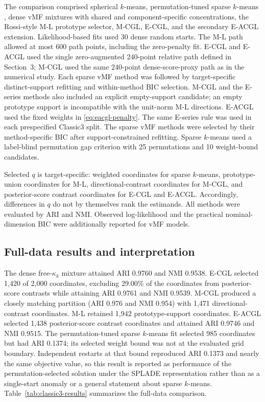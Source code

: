 \documentclass[preprint,12pt,authoryear]{elsarticle}
\begin{document}
The comparison comprised spherical $k$-means, permutation-tuned sparse
$k$-means \citep{witten2010sparseclustering}, dense vMF mixtures with shared
and component-specific concentrations, the Rossi-style M-L prototype selector,
M-CGL, E-CGL, and the secondary E-ACGL extension. Likelihood-based fits used
30 dense random starts.
The M-L path allowed at most 600 path points, including the zero-penalty fit.
E-CGL and E-ACGL used
the single zero-augmented 240-point relative path defined in Section~3; M-CGL
used the same 240-point dense-score-proxy path as in the numerical study.
Each sparse vMF method was followed by target-specific distinct-support
refitting and within-method BIC selection. M-CGL and the E-series methods also
included an explicit empty-support candidate; an empty prototype support is
incompatible with the unit-norm M-L directions. E-ACGL used the fixed weights
in \eqref{eq:eacgl-penalty}.
The same E-series rule was used in each prespecified Classic3 split.
The sparse vMF methods were selected by their method-specific BIC after
support-constrained refitting. Sparse $k$-means used a label-blind permutation
gap criterion with 25 permutations and 10 weight-bound candidates.

Selected $q$ is target-specific: weighted coordinates for sparse $k$-means,
prototype-union coordinates for M-L, directional-contrast coordinates for
M-CGL, and posterior-score contrast coordinates for E-CGL and E-ACGL.
Accordingly, differences in $q$ do not by themselves rank the estimands.
All methods were evaluated by ARI and NMI. Observed log-likelihood and the
practical nominal-dimension BIC were additionally reported for vMF models.

\subsection{Full-data results and interpretation}

The dense free-$\kappa_k$ mixture attained ARI 0.9760 and NMI 0.9538. E-CGL
selected 1,420 of 2,000 coordinates, excluding 29.00\% of the coordinates from
posterior-score contrasts while attaining ARI 0.9761 and NMI 0.9539.
M-CGL produced a closely matching partition (ARI 0.976 and NMI 0.954) with
1,471 directional-contrast coordinates.
M-L retained 1,942 prototype-support coordinates. E-ACGL selected 1,438
posterior-score contrast coordinates and attained ARI 0.9746 and NMI 0.9515.
The permutation-tuned sparse $k$-means fit selected 985 coordinates but had
ARI 0.1374; its selected weight bound was not at the evaluated grid boundary.
Independent restarts at that bound reproduced ARI 0.1373 and nearly the same
objective value, so this result is reported as performance of the
permutation-selected solution under the SPLADE representation rather than as
a single-start anomaly or a general statement about sparse $k$-means.
Table~\ref{tab:classic3-results} summarizes the full-data comparison.
\end{document}
